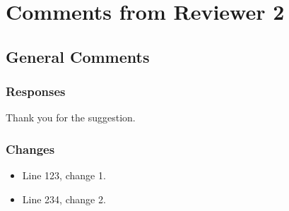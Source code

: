 \documentclass[12pt]{article}
\begin{document}
\newpage
\section{Comments from Reviewer 2}

\subsection{General Comments}
\begin{commentbox}
    \lipsum[6]

    \lipsum[7]
\end{commentbox}

\subsubsection*{Responses}
Thank you for the suggestion.

\subsubsection*{Changes}
\begin{itemize}
    \item Line 123, change 1.
    \item Line 234, change 2.
\end{itemize}


\newpage
\printbibliography
{}
\end{document}
